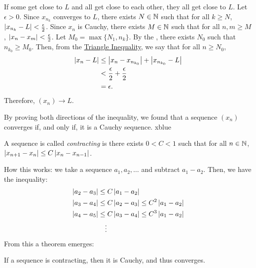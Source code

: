 {\begin{itemize}
              If some get close to \(L\) and all get close to each other, they all get close to \(L\). Let \(\epsilon > 0\). Since \(x_{n_k}\) converges to \(L\), there exists \(N \in \mathbb{N}\) such that for all \(k \geq N\), \(\left|x_{n_k} - L\right| < \frac{\epsilon}{2}\). Since \(x_n\) is Cauchy, there exists \(M \in \mathbb{N}\) such that for all \(n,m \geq M\), \(\left|x_n - x_m\right| < \frac{\epsilon}{2}\). Let \(M_0 = \max \{N_1, n_k\}\). By the , there exists \(N_0\) such that \(n_{k_0} \geq M_0\). Then, from the \hyperlink{Triangle Inequality}{Triangle Inequality}, we say that for all \(n \geq N_0\), \begin{align*}
                  \left|x_n - L\right| & \leq \left|x_n - x_{n_{k_0}}\right| + \left|x_{n_{k_0}} - L\right| \\
                                   & < \frac{\epsilon}{2} + \frac{\epsilon}{2}                  \\
                                   & = \epsilon.
              \end{align*} Therefore, \((x_n) \rightarrow L\).
    \end{itemize}}{By proving both directions of the inequality, we found that a sequence \((x_n)\) converges if, and only if, it is a Cauchy sequence.}%
{xblue}%

\begin{definition}
    A sequence is called \textit{contracting} is there exists \(0 < C < 1\) such that for all \(n \in \mathbb{N}\), \(\left|x_{n+1} - x_n\right| \leq C\left|x_n - x_{n-1}\right|\).
\end{definition}

How this works: we take a sequence \(a_1, a_2, \dots\) and subtract \(a_1 - a_2\). Then, we have the inequality: \begin{align*}
    \left|a_2 - a_3\right| & \leq C\left|a_1 - a_2\right| \\
    \left|a_3 - a_4\right| & \leq C\left|a_2 - a_3\right| \leq C^2\left|a_1 - a_2\right| \\
    \left|a_4 - a_5\right| & \leq C\left|a_3 - a_4\right| \leq C^3\left|a_1 - a_2\right| \\
    & \quad \vdots
\end{align*} From this a theorem emerges:

\begin{theorem}
    If a sequence is contracting, then it is Cauchy, and thus converges.
\end{theorem}

